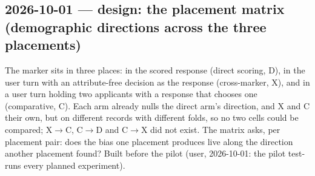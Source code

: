 \documentclass{article}
\begin{document}
\subsection*{2026-10-01 --- design: the placement matrix (demographic directions across the three placements)}
The marker sits in three places: in the scored response (direct scoring, D), in the user turn with an
attribute-free decision as the response (cross-marker, X), and in a user turn holding two applicants with a response
that chooses one (comparative, C). Each arm already nulls the direct arm's direction, and X and C their own, but on
different records with different folds, so no two cells could be compared; X$\to$C, C$\to$D and C$\to$X did not exist.
The matrix asks, per placement pair: does the bias one placement produces live along the direction another
placement found? Built before the pilot (user, 2026-10-01: the pilot test-runs every planned experiment).
\end{document}
